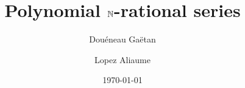 \title{Polynomial $\mathbb{N}$-rational series}
\author{
    Douéneau Gaëtan \and
    Lopez Aliaume
}
\date{\today}


\newcommand{\acknowledge}{
}

\newcommand{\makeabstract}{
    \begin{abstract}
        We propose a short counter-example to a
        previous result on $\Nat$-rational series
        by Karhumäki, and provide a proof for
        the corrected statement.
    \end{abstract}
}
